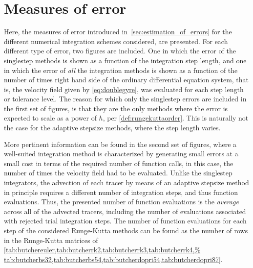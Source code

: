 \section{Measures of error}
\label{sec:measures_of_error}

Here, the measures of error introduced in~\cref{sec:estimation_of_errors} for
the different numerical integration schemes considered, are presented. For
each different type of error, two figures are included. One in which the error
of the singlestep methods is shown as a function of the integration step length,
and one in which the error of \emph{all} the integration methods is shown
as a function of the number of times right hand side of the ordinary
differential equation system, that is, the velocity field given by
\cref{eq:doublegyre}, was evaluated for each step length or tolerance level.
The reason for which only the singlestep errors are included in the first set of
figures, is that they are the only methods where the error is expected to scale
as a power of $h$, per \cref{def:rungekuttaorder}. This is naturally not the
case for the adaptive stepsize methods, where the step length varies.

More pertinent information can be found in the second set of figures, where
a well-suited integration method is characterized by generating small
errors at a small cost in terms of the required number of function calls,
in this case, the number of times the velocity field had to be evaluated.
Unlike the singlestep integrators, the advection of each tracer by means
of an adaptive stepsize method in principle requires a different number of
integration steps, and thus function evaluations. Thus, the presented number of
function evaluations is the \emph{average} across all of the advected tracers,
including the number of evaluations associated with rejected trial integration
steps. The number of function evaluations for each step of the considered
Runge-Kutta methods can be found as the number of rows in the Runge-Kutta
matrices of
\cref{tab:butchereuler,tab:butcherrk2,tab:butcherrk3,tab:butcherrk4,%
tab:butcherbs32,tab:butcherbs54,tab:butcherdopri54,tab:butcherdopri87}.



